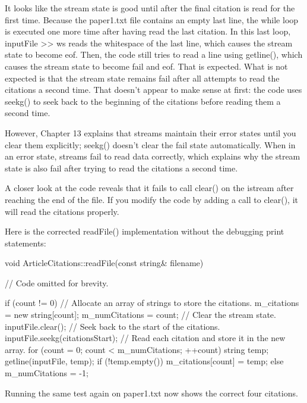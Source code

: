 It looks like the stream state is good until after the final citation is read for the first time. Because the paper1.txt file contains an empty last line, the while loop is executed one more time after having read the last citation. In this last loop, inputFile >{}> ws reads the whitespace of the last line, which causes the stream state to become eof. Then, the code still tries to read a line using getline(), which causes the stream state to become fail and eof. That is expected. What is not expected is that the stream state remains fail after all attempts to read the citations a second time. That doesn’t appear to make sense at first: the code uses seekg() to seek back to the beginning of the citations before reading them a second time.

However, Chapter 13 explains that streams maintain their error states until you clear them explicitly; seekg() doesn’t clear the fail state automatically. When in an error state, streams fail to read data correctly, which explains why the stream state is also fail after trying to read the citations a second time.

A closer look at the code reveals that it fails to call clear() on the istream after reaching the end of the file. If you modify the code by adding a call to clear(), it will read the citations properly.

Here is the corrected readFile() implementation without the debugging print statements:

\begin{cpp}
void ArticleCitations::readFile(const string& filename)
{
    // Code omitted for brevity.

    if (count != 0) {
        // Allocate an array of strings to store the citations.
        m_citations = new string[count];
        m_numCitations = count;
        // Clear the stream state.
        inputFile.clear();
        // Seek back to the start of the citations.
        inputFile.seekg(citationsStart);
        // Read each citation and store it in the new array.
        for (count = 0; count < m_numCitations; ++count) {
            string temp;
            getline(inputFile, temp);
            if (!temp.empty()) {
                m_citations[count] = temp;
            }
        }
    } else {
        m_numCitations = -1;
    }
}
\end{cpp}

Running the same test again on paper1.txt now shows the correct four citations.



